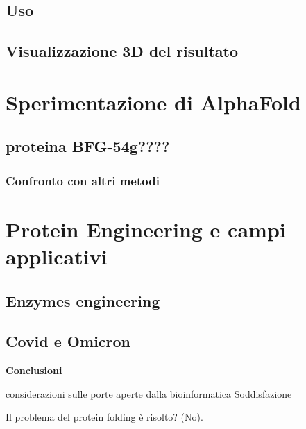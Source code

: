\section{Uso}
\section{Visualizzazione 3D del risultato}

\chapter{Sperimentazione di AlphaFold}
\section{proteina BFG-54g????}
\subsection{Confronto con altri metodi}

\chapter{Protein Engineering e campi applicativi}
\section{Enzymes engineering}
\section{Covid e Omicron}


\textbf{{\LARGE Conclusioni}}
\vspace{1cm}

considerazioni sulle porte aperte dalla bioinformatica
Soddisfazione

Il problema del protein folding è risolto? (No).

